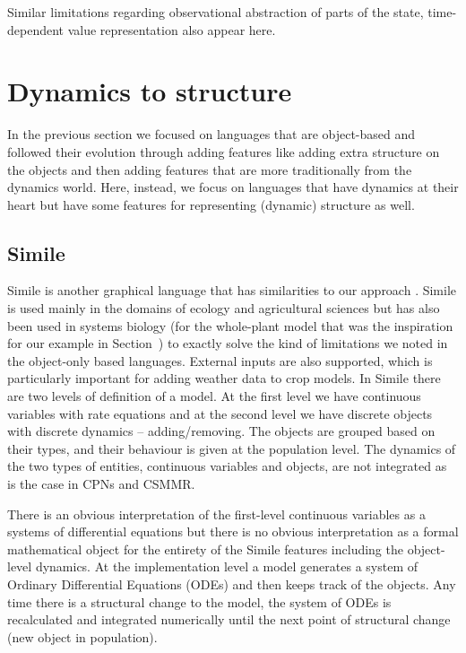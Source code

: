 Similar limitations regarding observational abstraction of parts of the state,
time-dependent value representation also appear here.

\section{Dynamics to structure}
\label{sec:dyns}
In the previous section we focused on languages that are object-based and
followed their evolution through adding features like adding extra structure on
the objects and then adding features that are more traditionally from the
dynamics world. Here, instead, we focus on languages that have dynamics at their
heart but have some features for representing (dynamic) structure as well.


\subsection{Simile}
\label{subsec:simile}
Simile is another graphical language that has similarities to our approach
\citep{muetzelfeldt_simile_2003}. Simile is used mainly in the domains of
ecology and agricultural sciences but has also been used in systems biology (for
the whole-plant model \citep{chew_multiscale_2014} that was the inspiration for
our example in Section~) to exactly solve the kind of limitations
we noted in the object-only based languages. External inputs are also supported,
which is particularly important for adding weather data to crop models. In
Simile there are two levels of definition of a model. At the first level we have
continuous variables with rate equations and at the second level we have
discrete objects with discrete dynamics -- adding/removing. The objects are
grouped based on their types, and their behaviour is given at the population
level. The dynamics of the two types of entities, continuous variables and objects, are
not integrated as is the case in CPNs and CSMMR.

There is an obvious interpretation of the first-level continuous variables as a
systems of differential equations but there is no obvious interpretation as a
formal mathematical object for the entirety of the Simile features including the
object-level dynamics. At the implementation level a model generates a system of
Ordinary Differential Equations (ODEs) and then keeps track of the objects. Any
time there is a structural change to the model, the system of ODEs is
recalculated and integrated numerically until the next point of structural
change (\eg new object in population).

